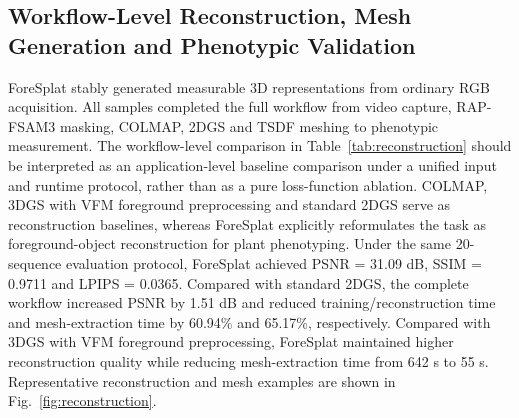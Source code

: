 \documentclass[a4paper]{cas-sc}
\begin{document}
\FloatBarrier



\subsection{Workflow-Level Reconstruction, Mesh Generation and Phenotypic Validation}\label{sec:workflow-validation-results}

ForeSplat stably generated measurable 3D representations from ordinary RGB acquisition. All samples completed the full workflow from video capture, RAP-FSAM3 masking, COLMAP, 2DGS and TSDF meshing to phenotypic measurement. The workflow-level comparison in Table~\ref{tab:reconstruction} should be interpreted as an application-level baseline comparison under a unified input and runtime protocol, rather than as a pure loss-function ablation. COLMAP, 3DGS with VFM foreground preprocessing and standard 2DGS serve as reconstruction baselines, whereas ForeSplat explicitly reformulates the task as foreground-object reconstruction for plant phenotyping. Under the same 20-sequence evaluation protocol, ForeSplat achieved PSNR = 31.09 dB, SSIM = 0.9711 and LPIPS = 0.0365. Compared with standard 2DGS, the complete workflow increased PSNR by 1.51 dB and reduced training/reconstruction time and mesh-extraction time by 60.94\% and 65.17\%, respectively. Compared with 3DGS with VFM foreground preprocessing, ForeSplat maintained higher reconstruction quality while reducing mesh-extraction time from 642 s to 55 s. Representative reconstruction and mesh examples are shown in Fig.~\ref{fig:reconstruction}.
\end{document}
